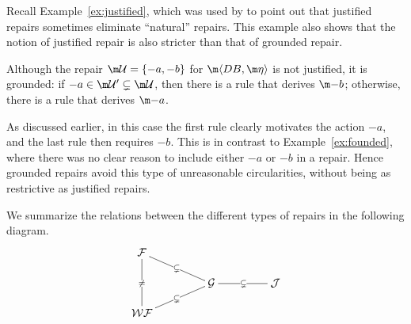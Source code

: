 Recall Example~\ref{ex:justified}, which was used by \citet{tase/Cruz-FilipeEGN13} to point out that justified repairs sometimes eliminate ``natural'' repairs.
This example also shows that the notion of justified repair is also stricter than that of grounded repair.
\begin{example}[Example~\ref{ex:justified} continued]
  Although the repair $\UU=\{-a,-b\}$ for $\fulldb$ is not justified, it is grounded: if ${-a}\in\UU'\subsetneq\UU$, then there is a rule that derives $\remove b$; otherwise, there is a rule that derives $\remove a$. %
\end{example}
As discussed earlier, in this case the first rule clearly motivates the action $-a$, and the last rule then requires $-b$.
This is in contrast to Example~\ref{ex:founded}, where there was no clear reason to include either $-a$ or $-b$ in a repair.
Hence grounded repairs avoid this type of unreasonable circularities, without being as restrictive as justified repairs.

We summarize the relations between the different types of repairs in the following diagram.
\[\xymatrix@R-1em@C+2em{%
  \mathcal F \ar@{-}[dd]|{\neq} \ar@{-}[dr]|{\subsetneq} \\
  & \mathcal G \ar@{-}[r]|{\subsetneq} & \mathcal J \\
  \mathcal{WF} \ar@{-}[ur]|{\subsetneq}
}
\]







